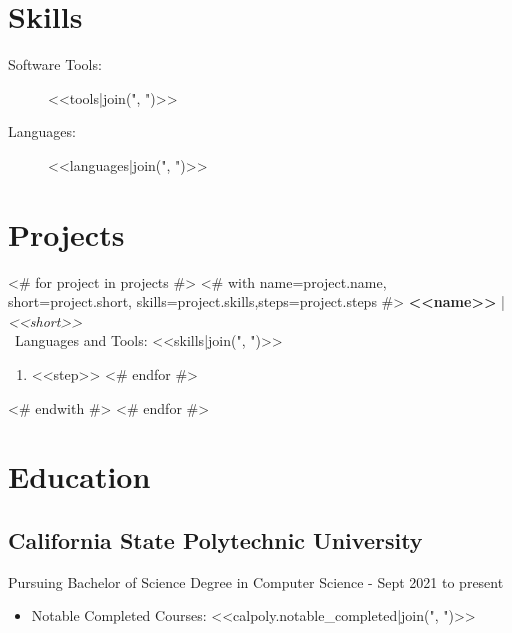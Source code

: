 \documentclass[a4paper]{article}
\begin{document}
\section*{Skills}
\begin{multicols}{2}
\begin{description}
    \item [ Software Tools: ] <<tools|join(", ")>>
        \columnbreak
    \item [ Languages: ] <<languages|join(", ")>>
\end{description}
\end{multicols}
\section*{Projects}
<# for project in projects #>
<# with name=project.name, short=project.short, skills=project.skills,steps=project.steps #>
\large
\textbf{<<name>>} | \normalsize \textit{<<short>>} \\\
\normalsize Languages and Tools: <<skills|join(", ")>>
\begin{enumerate}
<# for step in steps #>
\item <<step>>
<# endfor #>
\end{enumerate}
<# endwith #>
<# endfor #>

\section*{Education}
\subsection*{California State Polytechnic University}
Pursuing Bachelor of Science Degree in Computer Science - Sept 2021 to present
\begin{itemize}
    \item Notable Completed Courses: <<calpoly.notable_completed|join(", ")>>
\end{itemize}
\end{document}
